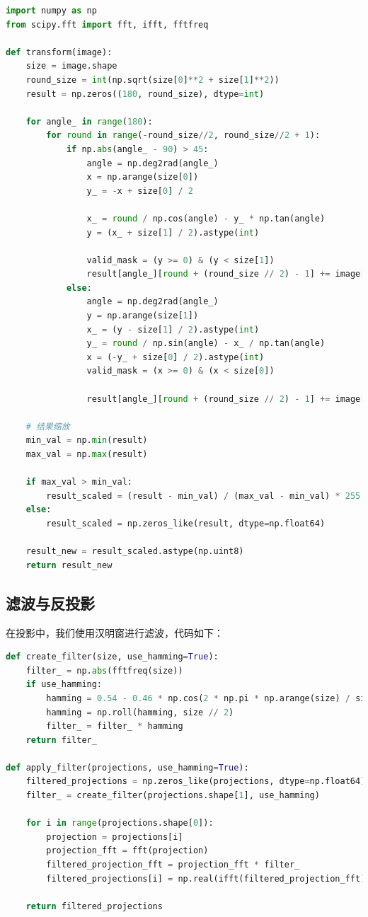 \documentclass{article}
\begin{document}
\begin{lstlisting}[language=Python]
import numpy as np
from scipy.fft import fft, ifft, fftfreq

def transform(image):
    size = image.shape
    round_size = int(np.sqrt(size[0]**2 + size[1]**2))
    result = np.zeros((180, round_size), dtype=int)

    for angle_ in range(180):
        for round in range(-round_size//2, round_size//2 + 1):
            if np.abs(angle_ - 90) > 45:
                angle = np.deg2rad(angle_)
                x = np.arange(size[0])
                y_ = -x + size[0] / 2

                x_ = round / np.cos(angle) - y_ * np.tan(angle)
                y = (x_ + size[1] / 2).astype(int)

                valid_mask = (y >= 0) & (y < size[1])
                result[angle_][round + (round_size // 2) - 1] += image[x[valid_mask], y[valid_mask]].sum()
            else:
                angle = np.deg2rad(angle_)
                y = np.arange(size[1])
                x_ = (y - size[1] / 2).astype(int)
                y_ = round / np.sin(angle) - x_ / np.tan(angle)
                x = (-y_ + size[0] / 2).astype(int)
                valid_mask = (x >= 0) & (x < size[0])
                    
                result[angle_][round + (round_size // 2) - 1] += image[x[valid_mask], y[valid_mask]].sum()

    # 结果缩放
    min_val = np.min(result)
    max_val = np.max(result)

    if max_val > min_val:
        result_scaled = (result - min_val) / (max_val - min_val) * 255
    else:
        result_scaled = np.zeros_like(result, dtype=np.float64)

    result_new = result_scaled.astype(np.uint8)
    return result_new
\end{lstlisting}

\subsection{滤波与反投影}
在投影中，我们使用汉明窗进行滤波，代码如下：

\begin{lstlisting}[language=Python]
def create_filter(size, use_hamming=True):
    filter_ = np.abs(fftfreq(size))
    if use_hamming:
        hamming = 0.54 - 0.46 * np.cos(2 * np.pi * np.arange(size) / size)
        hamming = np.roll(hamming, size // 2)
        filter_ = filter_ * hamming
    return filter_

def apply_filter(projections, use_hamming=True):
    filtered_projections = np.zeros_like(projections, dtype=np.float64)
    filter_ = create_filter(projections.shape[1], use_hamming)

    for i in range(projections.shape[0]):
        projection = projections[i]
        projection_fft = fft(projection)
        filtered_projection_fft = projection_fft * filter_
        filtered_projections[i] = np.real(ifft(filtered_projection_fft))
    
    return filtered_projections
\end{lstlisting}
\end{document}
